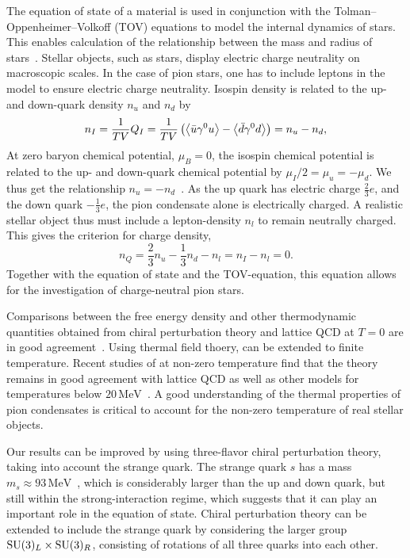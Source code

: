 The equation of state of a material is used in conjunction with the Tolman–Oppenheimer–Volkoff (TOV) equations to model the internal dynamics of stars.
This enables calculation of the relationship between the mass and radius of stars~\cite{Carroll:space-time}.
Stellar objects, such as stars, display electric charge neutrality on macroscopic scales.
In the case of pion stars, one has to include leptons in the model to ensure electric charge neutrality.
Isospin density is related to the up- and down-quark density $n_u$ and $n_d$ by
\begin{equation}
    n_I 
    = \frac{1}{TV} Q_I 
    = \frac{1}{TV} \left(\ex{\bar u \gamma^0 u} - \ex{\bar d \gamma^0 d} \right) 
    = n_u - n_d,
\end{equation}
At zero baryon chemical potential, $\mu_B = 0$, the isospin chemical potential is related to the up- and down-quark chemical potential by $\mu_I/2 = \mu_u = -\mu_d$.
We thus get the relationship $n_u = -n_d$~\cite{new_clas_of_compact_stars}.
As the up quark has electric charge $\frac{2}{3}e$, and the down quark $-\frac{1}{3}e$, the pion condensate alone is electrically charged.
A realistic stellar object thus must include a lepton-density $n_l$ to remain neutrally charged.
This gives the criterion for charge density,
\begin{equation}
    n_Q = \frac{2}{3}n_u - \frac{1}{3} n_d - n_l = n_I - n_l = 0.
\end{equation}
Together with the equation of state and the TOV-equation, this equation allows for the investigation of charge-neutral pion stars.

Comparisons between the free energy density and other thermodynamic quantities obtained from chiral perturbation theory and lattice QCD at $T = 0$ are in good agreement~\cite{Andersen:two-flavor-chpt,mojahed}.
Using thermal field thoery, \chpt can be extended to finite temperature.
Recent 
studies of \chpt at non-zero temperature find that the theory remains in good agreement with lattice QCD as well as other models for temperatures below $20 \, \text{MeV}$~\cite{andersen_mojahed:condensates_and_pressure}.
A good understanding of the thermal properties of pion condensates is critical to account for the non-zero temperature of real stellar objects.

Our results can be improved by using three-flavor chiral perturbation theory, taking into account the strange quark.
The strange quark $s$ has a mass $m_s \approx 93 \, \text{MeV}$~\cite{PDG}, which is considerably larger than the up and down quark, but still within the strong-interaction regime, which suggests that it can play an important role in the equation of state.
Chiral perturbation theory can be extended to include the strange quark by considering the larger group $\mathrm{SU}(3)_L \times \mathrm{SU}(3)_R$, consisting of rotations of all three quarks into each other.
